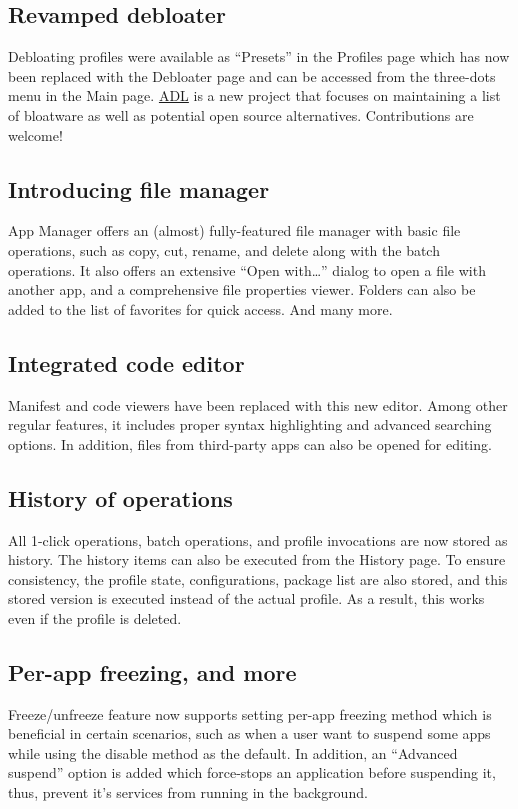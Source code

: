 \subsection{Revamped debloater}
Debloating profiles were available as ``Presets'' in the Profiles page which has now been replaced
with the Debloater page and can be accessed from the three-dots menu in the Main page.
\href{https://github.com/MuntashirAkon/android-debloat-list}{ADL} is a new project that focuses on
maintaining a list of bloatware as well as potential open source alternatives. Contributions are
welcome!

\subsection{Introducing file manager}
App Manager offers an (almost) fully-featured file manager with basic file operations, such as copy,
cut, rename, and delete along with the batch operations. It also offers an extensive ``Open with\dots''
dialog to open a file with another app, and a comprehensive file properties viewer. Folders can also
be added to the list of favorites for quick access. And many more.

\subsection{Integrated code editor}
Manifest and code viewers have been replaced with this new editor. Among other regular features, it
includes proper syntax highlighting and advanced searching options. In addition, files from
third-party apps can also be opened for editing.

\subsection{History of operations}
All 1-click operations, batch operations, and profile invocations are now stored as history. The
history items can also be executed from the History page. To ensure consistency, the profile state,
configurations, package list are also stored, and this stored version is executed instead of the
actual profile. As a result, this works even if the profile is deleted.

\subsection{Per-app freezing, and more}
Freeze/unfreeze feature now supports setting per-app freezing method which is beneficial in certain
scenarios, such as when a user want to suspend some apps while using the disable method as the
default. In addition, an ``Advanced suspend'' option is added which force-stops an application
before suspending it, thus, prevent it's services from running in the background.

